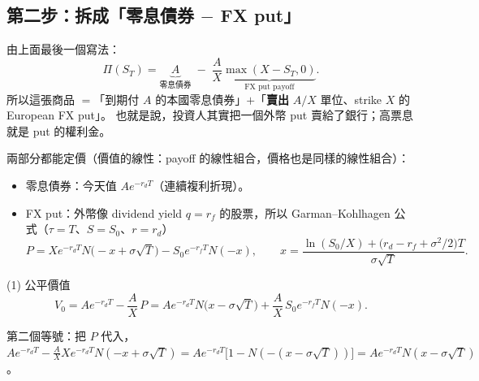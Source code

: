 \documentclass[11pt,a4paper]{article}
\begin{document}
\begin{center}
\end{center}

\subsection{第二步：拆成「零息債券 $-$ FX put」}

由上面最後一個寫法：
\[
  \Pi(S_T)=\underbrace{A}_{\text{零息債券}}\;-\;\frac{A}{X}\underbrace{\max(X-S_T,0)}_{\text{FX put payoff}}.
\]
所以這張商品 $=$「到期付 $A$ 的本國零息債券」$+$「\textbf{賣出} $A/X$ 單位、strike $X$ 的 European FX put」。
也就是說，投資人其實把一個外幣 put 賣給了銀行；高票息就是 put 的權利金。

兩部分都能定價（價值的線性：payoff 的線性組合，價格也是同樣的線性組合）：
\begin{itemize}
  \item 零息債券：今天值 $Ae^{-r_dT}$（連續複利折現）。
  \item FX put：外幣像 dividend yield $q=r_f$ 的股票，所以 Garman--Kohlhagen 公式（$\tau=T$、$S=S_0$、$r=r_d$）
  \[
    P=Xe^{-r_dT}N\bigl(-x+\sigma\sqrt T\bigr)-S_0e^{-r_fT}N(-x),\qquad
    x=\frac{\ln(S_0/X)+\bigl(r_d-r_f+\sigma^2/2\bigr)T}{\sigma\sqrt T}.
  \]
\end{itemize}

\begin{keybox}{(1) 公平價值}
\[
  V_0=Ae^{-r_dT}-\frac{A}{X}\,P
     =Ae^{-r_dT}N\bigl(x-\sigma\sqrt T\bigr)+\frac{A}{X}\,S_0e^{-r_fT}N(-x).
\]
\end{keybox}
第二個等號：把 $P$ 代入，$Ae^{-r_dT}-\frac AX Xe^{-r_dT}N(-x+\sigma\sqrt T)=Ae^{-r_dT}\bigl[1-N(-(x-\sigma\sqrt T))\bigr]=Ae^{-r_dT}N(x-\sigma\sqrt T)$。
\end{document}
